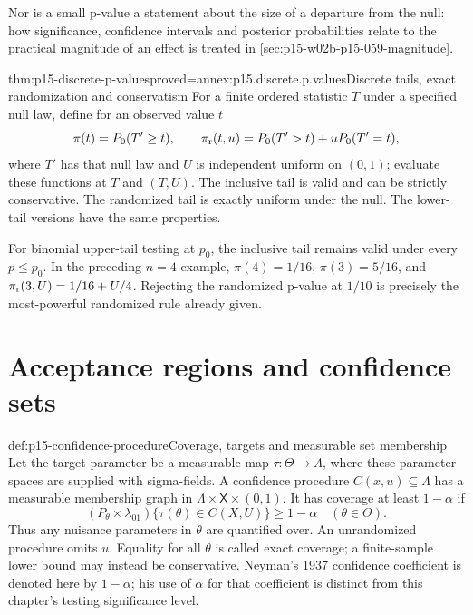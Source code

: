 Nor is a small p-value a statement about the size of a departure from the null: how significance, confidence intervals and posterior probabilities relate to the practical magnitude of an effect is treated in \cref{sec:p15-w02b-p15-059-magnitude}.

\begin{hbtheorem}{thm:p15-discrete-p-values}{proved=annex:p15.discrete.p.values}{Discrete tails, exact randomization and conservatism}
For a finite ordered statistic \(T\) under a specified
null law, define for an observed value \(t\)
\[
 \pi(t)=P_0(T'\geq t),\qquad
 \pi_{\rm r}(t,u)=P_0(T'>t)+u P_0(T'=t),
\]
where \(T'\) has that null law and \(U\) is independent
uniform on \((0,1)\); evaluate these functions at \(T\) and \((T,U)\).
The inclusive tail is valid and can be strictly conservative.
The randomized tail is exactly uniform under the null.
The lower-tail versions have the same properties.

For binomial upper-tail testing at \(p_0\), the inclusive
tail remains valid under every \(p\leq p_0\).
In the preceding \(n=4\) example,
\(\pi(4)=1/16\), \(\pi(3)=5/16\), and
\(\pi_{\rm r}(3,U)=1/16+U/4\).
Rejecting the randomized p-value at \(1/10\) is precisely
the most-powerful randomized rule already given.
\end{hbtheorem}

\section{Acceptance regions and confidence sets}

\begin{hbdefinition}{def:p15-confidence-procedure}{Coverage, targets and measurable set membership}
Let the target parameter be a measurable map
\(\tau:\Theta\to\Lambda\), where these parameter spaces
are supplied with sigma-fields. A confidence procedure
\(C(x,u)\subseteq\Lambda\) has a measurable membership
graph in
\(\Lambda\times\mathsf X\times(0,1)\).
It has coverage at least \(1-\alpha\) if
\[
            (P_\theta\times\lambda_{01})\{\tau(\theta)\in C(X,U)\}
                                     \geq1-\alpha
                                  \quad(\theta\in\Theta).
\]
Thus any nuisance parameters in \(\theta\) are quantified
over. An unrandomized procedure omits \(u\).
Equality for all \(\theta\) is called exact coverage;
a finite-sample lower bound may instead be conservative.
Neyman's 1937 confidence coefficient is denoted here
by \(1-\alpha\); his use of \(\alpha\) for that coefficient
is distinct from this chapter's testing significance level.
\end{hbdefinition}

